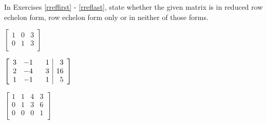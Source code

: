 \documentclass{ximera}
\begin{document}
	\author{Stitz-Zeager}



\label{ExercisesforAugMatrices}
\begin{question}
In Exercises \ref{rreffirst} - \ref{rreflast}, state whether the given matrix is in reduced row echelon form, row echelon form only or in neither of those forms.

\begin{problem}\label{rreffirst}
$\left[ \begin{array}{rr|r} 
1 & 0 & 3 \\ 
0 & 1 & 3  \\ 
\end{array} \right]$

\begin{multipleChoice}
\end{multipleChoice}
\end{problem}

\begin{problem}
$\left[ \begin{array}{rrr|r} 
3 & -1 & \hphantom{-}1 & 3 \\ 
2 & -4 & 3 & 16 \\ 
1 & -1 & 1 & 5  \\
\end{array} \right]$

\begin{multipleChoice}
\end{multipleChoice}
\end{problem}

\begin{problem}
$\left[ \begin{array}{rrr|r} 
1 & 1 & 4 & 3 \\ 
0 & 1 & 3 & 6 \\ 
0 & 0 & 0 & 1  \\
\end{array} \right]$

\begin{multipleChoice}
\end{multipleChoice}
\end{problem}


\end{question}
\end{document}

